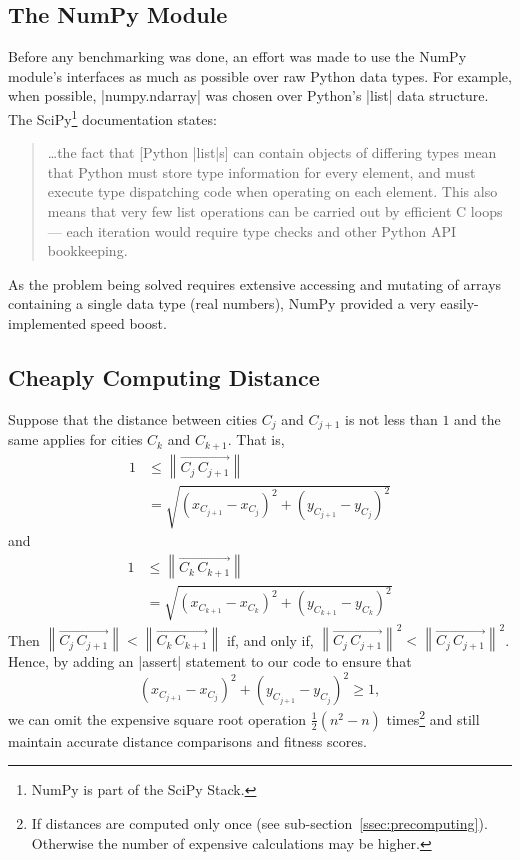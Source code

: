 \subsection{The NumPy Module}
Before any benchmarking was done, an effort was made to use the 
NumPy \cite{numpy} module's interfaces as much as possible over raw 
Python data types. For example, when possible, |numpy.ndarray| was 
chosen over Python's |list| data structure. The SciPy\footnote{NumPy is
part of the SciPy Stack.} documentation states:
\begin{quote}
	 \ldots the fact that [Python |list|s] can contain objects of differing 
	 types mean that Python must store type information for every 
	 element, and must execute type dispatching code when operating 
	 on each element. This also means that very few list operations can 
	 be carried out by efficient C loops --- each iteration would require 
	 type checks and other Python API bookkeeping. \cite{scipy_docs}
\end{quote}
As the problem being solved requires extensive accessing and mutating
of arrays containing a single data type (\ie real numbers), NumPy 
provided a very easily-implemented speed boost.

\subsection{Cheaply Computing Distance}\label{ssec:cheap}
Suppose that the distance between cities $C_j$ and $C_{j+1}$ is not less
 than $1$ and the same applies for cities $C_k$ and $C_{k+1}$. That is, 
\begin{align*}
\textstyle 1 &\leqslant \left\lVert \overrightarrow{C_j \, C_{j+1}} \right\rVert \\
&= \sqrt{(x_{C_{j+1}} - x_{C_j})^2 + (y_{C_{j+1}} - y_{C_j})^2}
\end{align*}
and
\begin{align*}
\textstyle 1 &\leqslant \left\lVert \overrightarrow{C_k\, C_{k+1}} \right\rVert \\
&= \sqrt{(x_{C_{k+1}} - x_{C_k})^2 + (y_{C_{k+1}} - y_{C_k})^2}
\end{align*}
Then 
$\left\lVert \overrightarrow{C_j\, C_{j+1}} \right\rVert < \left\lVert \overrightarrow{C_k\, C_{k+1}} \right\rVert$ 
if, and only if, 
$\left\lVert \overrightarrow{C_j\, C_{j+1}} \right\rVert^2 < \left\lVert \overrightarrow{C_j\, C_{j+1}} \right\rVert^2$.
Hence, by adding an |assert| statement to our code to ensure that 
\begin{equation*}
(x_{C_{j+1}} - x_{C_j})^2 + (y_{C_{j+1}} - y_{C_j})^2 \geqslant 1,
\end{equation*}
we can omit the expensive square root operation $\frac{1}{2}(n^2 - n)$ 
times\footnote{If distances are computed only once (see
sub-section~\ref{ssec:precomputing}). Otherwise the number of expensive
calculations may be higher.} and still maintain accurate distance 
comparisons and fitness scores. 

